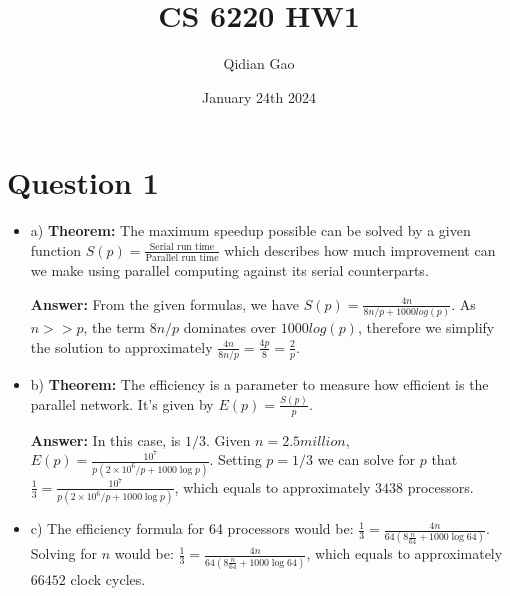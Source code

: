 \documentclass{article}
\title{CS 6220 HW1}
\author{Qidian Gao}
\date{January 24th 2024}
\begin{document}
\maketitle
\section{Question 1}
\begin{itemize}
    \item a) \textbf{Theorem:} The maximum speedup possible can be solved by a given function $S(p) = \frac{\text{Serial run time}}{\text{Parallel run time}}$ which describes how much improvement can we make using parallel computing against its serial counterparts.\par
    \textbf{Answer:} From the given formulas, we have $S(p) = \frac{4n}{8n/p+1000log(p)}$. As $n>>p$, the term $8n/p$ dominates over $1000log(p)$, therefore we simplify the solution to approximately $\frac{4n}{8n/p}=\frac{4p}{8}=\frac{2}{p}$.
    \item b) \textbf{Theorem: }The efficiency is a parameter to measure how efficient is the parallel network. It's given by $E(p)=\frac{S(p)}{p}$.\par
    \textbf{Answer:} In this case, is $1/3$. Given $n=2.5 million$, $E(p) = \frac{10^7}{p(2 \times 10^6/p + 1000 \log p)}$. Setting $p=1/3$ we can solve for $p$ that $\frac{1}{3} = \frac{10^7}{p(2 \times 10^6/p + 1000 \log p)}$, which equals to approximately $3438$ processors.
    \item c) The efficiency formula for 64 processors would be: $\frac{1}{3} = \frac{4n}{64(8\frac{n}{64} + 1000 \log 64)}$. Solving for $n$ would be: $\frac{1}{3} = \frac{4n}{64(8\frac{n}{64} + 1000 \log 64)}$, which equals to approximately $66452$ clock cycles.
\end{itemize}
\end{document}
